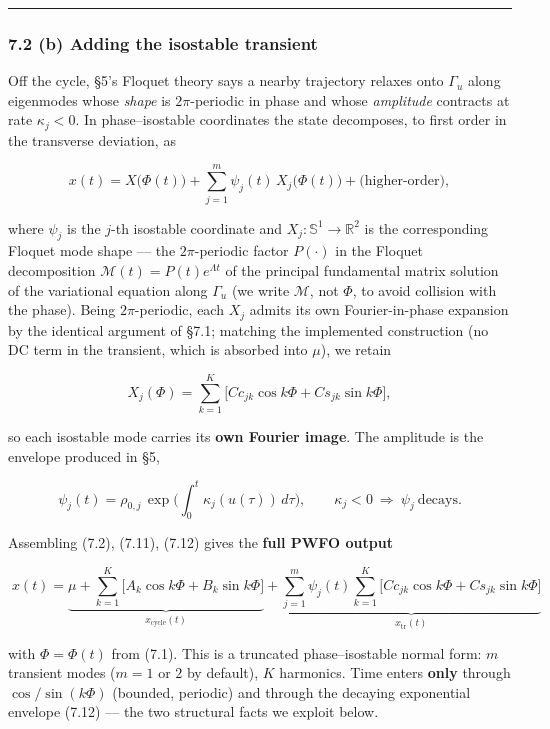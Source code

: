 \documentclass[
  11pt,
]{article}
\providecommand{\lt}{<}
\begin{document}
\begin{center}\rule{0.5\linewidth}{0.5pt}\end{center}

\subsubsection{7.2 (b) Adding the isostable
transient}\label{b-adding-the-isostable-transient}

Off the cycle, §5's Floquet theory says a nearby trajectory relaxes onto
\(\Gamma_u\) along eigenmodes whose \emph{shape} is \(2\pi\)-periodic in
phase and whose \emph{amplitude} contracts at rate \(\kappa_j\lt 0\). In
phase--isostable coordinates the state decomposes, to first order in the
transverse deviation, as

\[
x(t)=X\big(\Phi(t)\big)+\sum_{j=1}^{m}\psi_j(t)\,X_j\big(\Phi(t)\big)+\text{(higher-order)}, \tag{7.10}
\]

where \(\psi_j\) is the \(j\)-th isostable coordinate and
\(X_j:\mathbb{S}^1\to\mathbb{R}^2\) is the corresponding Floquet mode
shape --- the \(2\pi\)-periodic factor \(P(\cdot)\) in the Floquet
decomposition \(\mathcal{M}(t)=P(t)e^{\Lambda t}\) of the principal
fundamental matrix solution of the variational equation along
\(\Gamma_u\) (we write \(\mathcal{M}\), not \(\Phi\), to avoid collision
with the phase). Being \(2\pi\)-periodic, each \(X_j\) admits its own
Fourier-in-phase expansion by the identical argument of §7.1; matching
the implemented construction (no DC term in the transient, which is
absorbed into \(\mu\)), we retain

\[
X_j(\Phi)=\sum_{k=1}^{K}\Big[Cc_{jk}\cos k\Phi+Cs_{jk}\sin k\Phi\Big], \tag{7.11}
\]

so each isostable mode carries its \textbf{own Fourier image}. The
amplitude is the envelope produced in §5,

\[
\psi_j(t)=\rho_{0,j}\,\exp\!\Big(\textstyle\int_0^t\kappa_j(u(\tau))\,d\tau\Big),\qquad \kappa_j\lt 0\ \Rightarrow\ \psi_j\ \text{decays}. \tag{7.12}
\]

Assembling (7.2), (7.11), (7.12) gives the \textbf{full PWFO output}

\[
\boxed{\;
x(t)=\underbrace{\mu+\sum_{k=1}^{K}\big[A_k\cos k\Phi+B_k\sin k\Phi\big]}_{x_{\text{cycle}}(t)}
+\underbrace{\sum_{j=1}^{m}\psi_j(t)\sum_{k=1}^{K}\big[Cc_{jk}\cos k\Phi+Cs_{jk}\sin k\Phi\big]}_{x_{\text{tr}}(t)}\;}\tag{7.13}
\]

with \(\Phi=\Phi(t)\) from (7.1). This is a truncated phase--isostable
normal form: \(m\) transient modes (\(m=1\) or \(2\) by default), \(K\)
harmonics. Time enters \textbf{only} through \(\cos/\sin(k\Phi)\)
(bounded, periodic) and through the decaying exponential envelope (7.12)
--- the two structural facts we exploit below.
\end{document}

